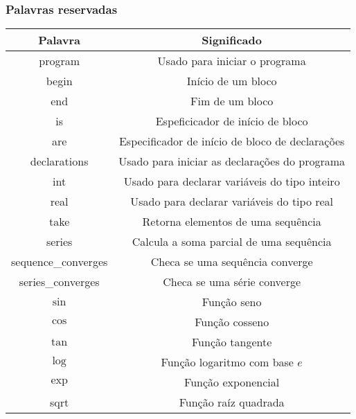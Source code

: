 \documentclass{beamer}
\begin{document}
\begin{frame}[fragile]
  \frametitle{Palavras reservadas}
{\small
\begin{table}[h]
\begin{center}
\begin{tabular}{|c|c|}
\hline
\textbf{Palavra}             & \textbf{Significado}                                                         \\ \hline
program             & Usado para iniciar o programa \\ \hline
begin               & In\'icio de um bloco \\ \hline
end                 & Fim de um bloco \\ \hline
is                  & Espeficicador de in\'icio de bloco \\ \hline
are                 & Especificador de in\'icio de bloco de declara\c c\~oes \\ \hline
declarations        & Usado para iniciar as declara\c c\~oes do programa \\ \hline
int                 & Usado para declarar vari\'aveis do tipo inteiro                     \\ \hline
real                & Usado para declarar vari\'aveis do tipo real                        \\ \hline
take                & Retorna elementos de uma sequ\^encia                \\ \hline
series              & Calcula a soma parcial de uma sequ\^encia           \\ \hline
sequence\_converges & Checa se uma sequ\^encia converge                   \\ \hline
series\_converges   & Checa se uma s\'erie converge                   \\ \hline
$\sin$              & Fun\c c\~ao seno                                                    \\ \hline
$\cos$              & Fun\c c\~ao cosseno                                                 \\ \hline
$\tan$              & Fun\c c\~ao tangente                                                \\ \hline
$\log$              & Fun\c c\~ao logaritmo com base $e$                                  \\ \hline
$\exp$              & Fun\c c\~ao exponencial                                             \\ \hline
sqrt                & Fun\c c\~ao ra\'iz quadrada                                         \\ \hline
\end{tabular}
\end{center}
\end{table}
}
\end{frame}
\end{document}
